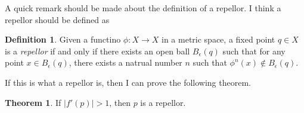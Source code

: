 \documentclass[12pt, letterpaper]{article}
\theoremstyle{definition}
\newtheorem*{definition}{Definition}
\newtheorem{theorem}{Theorem}
\begin{document}
A quick remark should be made about the definition of a repellor. I think a repellor should be defined as

\begin{definition}
    Given a functino $\phi : X\to X$ in a metric space, a fixed point $q\in X$ is a \textit{repellor} if and only if there exists an open ball $B_\epsilon(q)$ such that
    for any point $x\in B_\epsilon(q)$, there exists a natrual number $n$ such that $\phi^n(x)\not \in B_\epsilon(q)$.
\end{definition}

If this is what a repellor is, then I can prove the following theorem.

\begin{theorem}
    If $ |f'(p)| > 1 $, then $p$ is a repellor.
\end{theorem}
\end{document}
